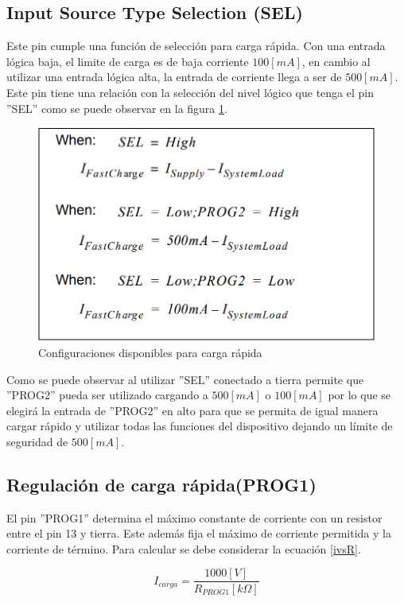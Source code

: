 \subsection{Input Source Type Selection (SEL)}
Este pin cumple una función de selección para carga rápida. Con una entrada lógica baja, el limite de carga es de baja corriente $100[mA]$, en cambio al utilizar una entrada lógica alta, la entrada de corriente llega a ser de $500[mA]$. Este pin tiene una relación con la selección del nivel lógico que tenga el pin ''SEL'' como se puede observar en la figura \ref{cargarapida}.\\
\begin{figure}[H]
\centering
\includegraphics[scale=0.5]{figuras/bateria/cargarapida.png}
\caption{Configuraciones disponibles para carga rápida}
\label{cargarapida}
\end{figure}

Como se puede observar al utilizar ''SEL'' conectado a tierra permite que ''PROG2'' pueda ser utilizado cargando a $500[mA]$ o $100[mA]$ por lo que se elegirá la entrada de ''PROG2'' en alto para que se permita de igual manera cargar rápido y utilizar todas las funciones del dispositivo dejando un límite de seguridad de $500[mA]$.

\subsection{Regulación de carga rápida(PROG1)}
El pin ''PROG1'' determina el máximo constante de corriente con un resistor entre el pin 13 y tierra. Este además fija el máximo de corriente permitida y la corriente de término. Para calcular se debe considerar la ecuación \ref{ivsR}.

\begin{equation}\label{ivsR}
I_{carga} = \frac{1000[V]}{R_{PROG1}[k\Omega]}
\end{equation}

